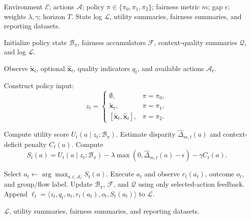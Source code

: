 \documentclass[conference]{IEEEtran}
\begin{document}
\begin{algorithm}[t]

\caption{EQUITAS-Mediated Fairness-Aware Routing}

\label{alg:equitas_bandit}

\small

\begin{tcolorbox}[
  colback=gray!4,
  colframe=gray!35,
  boxrule=0.3pt,
  arc=2pt,
  left=3pt,
  right=3pt,
  top=3pt,
  bottom=3pt
]

\begin{algorithmic}

\Require Environment $\mathcal{E}$; actions $\mathcal{A}$; policy
$\pi \in \{\pi_0,\pi_1,\pi_2\}$; fairness metric $m$; gap $\epsilon$;
weights $\lambda,\gamma$; horizon $T$.
\Ensure State log $\mathcal{L}$, utility summaries, fairness summaries, and
reporting datasets.

\State Initialize policy state $\mathcal{B}_{\pi}$, fairness accumulators
$\mathcal{F}$, context-quality summaries $\mathcal{Q}$, and log
$\mathcal{L}$.

    \State Observe $\tilde{\mathbf{x}}_t$, optional $\hat{\mathbf{x}}_t$,
    quality indicators $q_t$, and available actions $\mathcal{A}_t$.

    \State Construct policy input:
    \[
    z_t =
    \begin{cases}
    \emptyset, & \pi=\pi_0,\\
    \tilde{\mathbf{x}}_t, & \pi=\pi_1,\\
    [\tilde{\mathbf{x}}_t,\hat{\mathbf{x}}_t], & \pi=\pi_2.
    \end{cases}
    \]

        \State Compute utility score $U_t(a\mid z_t;\mathcal{B}_{\pi})$.
        \State Estimate disparity $\widehat{\Delta}_{m,t}(a)$ and
        context-deficit penalty $C_t(a)$.
        \State Compute
        \[
        S_t(a)=
        U_t(a\mid z_t;\mathcal{B}_{\pi})
        -\lambda\max(0,\widehat{\Delta}_{m,t}(a)-\epsilon)
        -\gamma C_t(a).
        \]
    \EndFor

    \State Select $a_t \leftarrow \arg\max_{a\in\mathcal{A}_t} S_t(a)$.
    \State Execute $a_t$ and observe $r_t(a_t)$, outcome $o_t$, and group/flow label.
    \State Update $\mathcal{B}_{\pi}$, $\mathcal{F}$, and $\mathcal{Q}$
    using only selected-action feedback.
    \State Append
    $\ell_t=\langle z_t,q_t,a_t,r_t(a_t),o_t,S_t(a_t)\rangle$
    to $\mathcal{L}$.
\EndFor

\State \Return $\mathcal{L}$, utility summaries, fairness summaries, and
reporting datasets.

\end{algorithmic}
\end{tcolorbox}
\end{algorithm}
\end{document}
